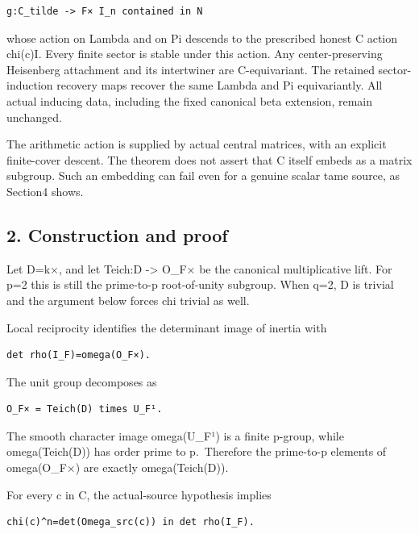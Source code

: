 \begin{Verbatim}[fontsize=\small,breaklines=true,breakanywhere=true]
g:C_tilde -> F× I_n contained in N
\end{Verbatim}

whose action on Lambda and on Pi descends to the prescribed honest C
action chi(c)I. Every finite sector is stable under this action. Any
center-preserving Heisenberg attachment and its intertwiner are
C-equivariant. The retained sector-induction recovery maps recover the
same Lambda and Pi equivariantly. All actual inducing data, including
the fixed canonical beta extension, remain unchanged.

The arithmetic action is supplied by actual central matrices, with an
explicit finite-cover descent. The theorem does not assert that C itself
embeds as a matrix subgroup. Such an embedding can fail even for a
genuine scalar tame source, as Section4 shows.

\hypertarget{odd_scalar-construction-and-proof}{%
\subsection{2. Construction and proof}\label{odd_scalar-construction-and-proof}}

Let D=k×, and let Teich:D -\textgreater{} O\_F× be the canonical
multiplicative lift. For p=2 this is still the prime-to-p root-of-unity
subgroup. When q=2, D is trivial and the argument below forces chi
trivial as well.

Local reciprocity identifies the determinant image of inertia with

\begin{Verbatim}[fontsize=\small,breaklines=true,breakanywhere=true]
det rho(I_F)=omega(O_F×).
\end{Verbatim}

The unit group decomposes as

\begin{Verbatim}[fontsize=\small,breaklines=true,breakanywhere=true]
O_F× = Teich(D) times U_F¹.
\end{Verbatim}

The smooth character image omega(U\_F¹) is a finite p-group, while
omega(Teich(D)) has order prime to p.~Therefore the prime-to-p elements
of omega(O\_F×) are exactly omega(Teich(D)).

For every c in C, the actual-source hypothesis implies

\begin{Verbatim}[fontsize=\small,breaklines=true,breakanywhere=true]
chi(c)^n=det(Omega_src(c)) in det rho(I_F).
\end{Verbatim}

